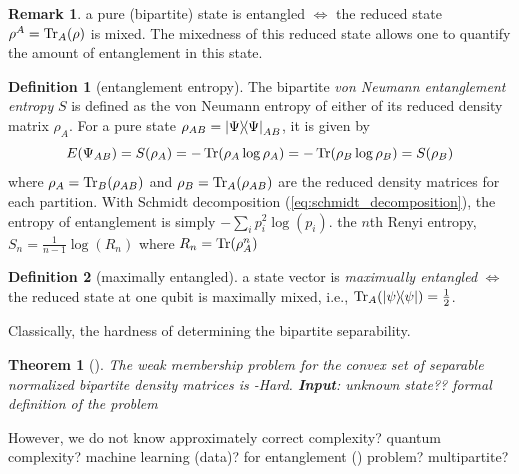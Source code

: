 \documentclass[
10pt,
aps,
pra,
linenumbers,
floatfix,
]{revtex4-2}
\theoremstyle{plain}
\newtheorem{theorem}{Theorem}
\newtheorem{question}{Question}
\theoremstyle{definition}
\newtheorem{definition}{Definition}
\newtheorem{remark}{Remark}
\newcommand{\dm}{\rho}
\begin{document}
\begin{remark}
	a pure (bipartite) state is entangled $\iff$ the reduced state $\dm^A=\Tr_A(\dm)$ is mixed.
	The mixedness of this reduced state allows one to quantify the amount of entanglement in this state.
\end{remark}
\begin{definition}[entanglement entropy]\label{def:entanglement_entropy}
	The bipartite \emph{von Neumann entanglement entropy} $S$
	is defined as the von Neumann entropy of either of
	its reduced density matrix $\dm_A$.
	For a pure state $\dm_{AB}=\op{\Psi}{\Psi}_{AB}$,
	it is given by
	\begin{equation}
		E(\Psi_{AB}) 
		= S(\dm_A)
		= -\Tr(\dm_A \log \dm_A)
		= -\Tr(\dm_B \log \dm_B)
		= S(\dm_B)
	\end{equation}
	where $\dm_A= \Tr_B(\dm_{AB})$ and $\dm_B = \Tr_A(\dm_{AB})$ 
	are the reduced density matrices for each partition.
	With Schmidt decomposition (\cref{eq:schmidt_decomposition}), the entropy of entanglement is simply $-\sum_ip_i^2\log(p_i)$.
	the $n$th Renyi entropy,
	$S_n = \frac{1}{n-1} \log (R_n)$
	where $R_n = \Tr(\dm^n_A)$
\end{definition}
\begin{definition}[maximally entangled]
	a state vector is \emph{maximually entangled} $\iff$ the reduced state at one qubit is maximally mixed, i.e.,
	$\Tr_A(\op{\psi})=\frac{1}{2}$.
\end{definition}
Classically, the hardness of determining the bipartite separability.
\begin{theorem}[\cite{gurvitsClassicalDeterministicComplexity2003}]
	The weak membership problem for the convex set of separable normalized bipartite density matrices is -Hard.
	\textbf{Input}: unknown state?? formal definition of the problem
	\cite{ioannouComputationalComplexityQuantum2007}
\end{theorem}
	However, we do not know 
	approximately correct complexity? quantum complexity? machine learning (data)? for entanglement () problem? multipartite?
\end{document}

